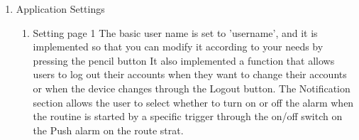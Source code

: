 \begin{enumerate}[label=\arabic*.]
    \item {\large{Application Settings}}\\
          \begin{enumerate}[label*={\arabic*.},ref=\theenumi.\arabic*]
              \setlength{\itemindent}{0.5cm}
                \item Setting page 1
            The basic user name is set to 'username', and it is implemented so that you can modify it according to your needs by pressing the pencil button It also implemented a function that allows users to log out their accounts when they want to change their accounts or when the device changes through the Logout button. The Notification section allows the user to select whether to turn on or off the alarm when the routine is started by a specific trigger through the on/off switch on the Push alarm on the route strat. \\\\  


\end{enumerate}
\end{enumerate}
